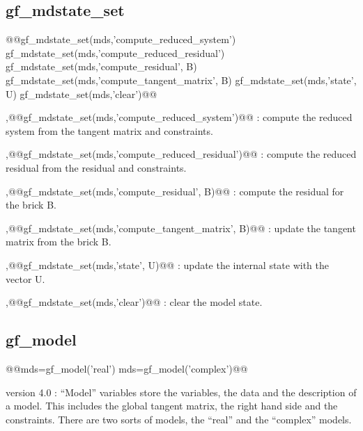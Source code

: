 \subsection{gf\_mdstate_set}
\begin{synopsis}
@@gf_mdstate_set(mds,'compute_reduced_system')
gf_mdstate_set(mds,'compute_reduced_residual')
gf_mdstate_set(mds,'compute_residual', \tmdbrick B)
gf_mdstate_set(mds,'compute_tangent_matrix', \tmdbrick B)
gf_mdstate_set(mds,'state', \tvec U)
gf_mdstate_set(mds,'clear')@@
\end{synopsis}
\begin{cmddescription}
\sep{@@gf_mdstate_set(mds,'compute_reduced_system')@@} :
compute the reduced system from the tangent matrix and constraints.

\sep{@@gf_mdstate_set(mds,'compute_reduced_residual')@@} :
compute the reduced residual from the residual and constraints.

\sep{@@gf_mdstate_set(mds,'compute_residual', \tmdbrick B)@@} :
compute the residual for the brick B.

\sep{@@gf_mdstate_set(mds,'compute_tangent_matrix', \tmdbrick B)@@} :
update the tangent matrix from the brick B.

\sep{@@gf_mdstate_set(mds,'state', \tvec U)@@} :
update the internal state with the vector U.

\sep{@@gf_mdstate_set(mds,'clear')@@} :
clear the model state.
\end{cmddescription}
\newpage

\subsection{gf\_model}
\begin{synopsis}
@@mds=gf_model('real')
mds=gf_model('complex')@@
\end{synopsis}
\begin{cmddescription}
  \gf version 4.0 : ``Model'' variables store the variables, the data and the description of a model. This includes the global tangent matrix, the right hand side
  and the constraints. There are two sorts of models, the
  ``real'' and the ``complex'' models.
\end{cmddescription}
\newpage


